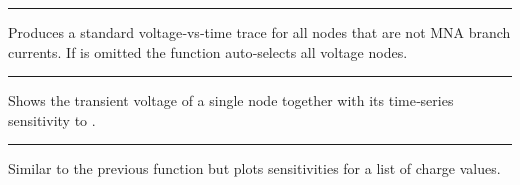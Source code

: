 \documentclass[letterpaper,10pt,english]{sphinxmanual}
\begin{document}
\bigskip\hrule\bigskip



\begin{fulllineitems}

\pysigstartsignatures
\pysigline
{}
\pysigline
{}
\pysigstopsignatures
\sphinxAtStartPar
Produces a standard voltage‑vs‑time trace for all nodes that are not MNA
branch currents.  If  is omitted the function auto‑selects all
voltage nodes.

\end{fulllineitems}



\bigskip\hrule\bigskip



\begin{fulllineitems}

\pysigstartsignatures
\pysigline
{}
\pysigline
{}
\pysigline
{}
\pysigline
{}
\pysigstopsignatures
\sphinxAtStartPar
Shows the transient voltage of a single node together with its time‑series
sensitivity to .

\end{fulllineitems}



\bigskip\hrule\bigskip



\begin{fulllineitems}

\pysigstartsignatures
\pysigline
{}
\pysigline
{}
\pysigline
{}
\pysigline
{}
\pysigline
{}
\pysigstopsignatures
\sphinxAtStartPar
Similar to the previous function but plots  sensitivities
for a list of charge values.

\end{fulllineitems}
\end{document}
